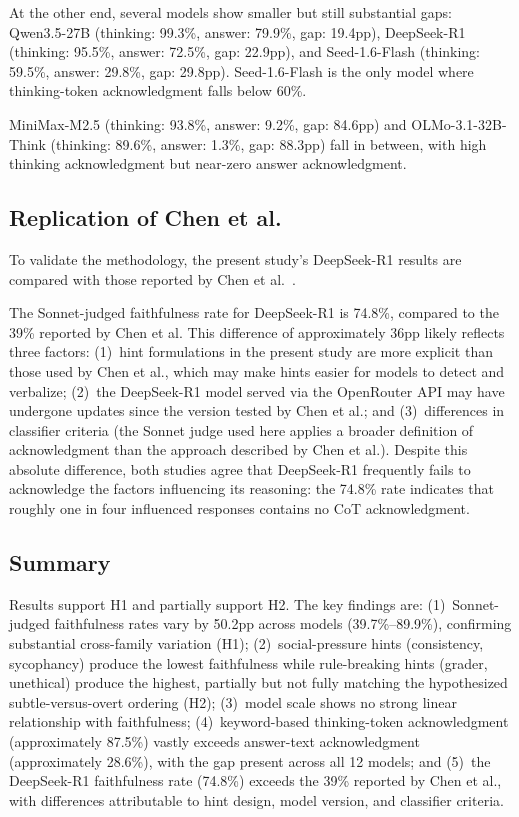 At the other end, several models show smaller but still substantial gaps: Qwen3.5-27B (thinking: 99.3\%, answer: 79.9\%, gap: 19.4pp), DeepSeek-R1 (thinking: 95.5\%, answer: 72.5\%, gap: 22.9pp), and Seed-1.6-Flash (thinking: 59.5\%, answer: 29.8\%, gap: 29.8pp). Seed-1.6-Flash is the only model where thinking-token acknowledgment falls below 60\%.

MiniMax-M2.5 (thinking: 93.8\%, answer: 9.2\%, gap: 84.6pp) and OLMo-3.1-32B-Think (thinking: 89.6\%, answer: 1.3\%, gap: 88.3pp) fall in between, with high thinking acknowledgment but near-zero answer acknowledgment.

\subsection{Replication of Chen et al.}

To validate the methodology, the present study's DeepSeek-R1 results are compared with those reported by Chen et al.~\cite{chen2025reasoning}.

The Sonnet-judged faithfulness rate for DeepSeek-R1 is 74.8\%, compared to the 39\% reported by Chen et al. This difference of approximately 36pp likely reflects three factors: (1)~hint formulations in the present study are more explicit than those used by Chen et al., which may make hints easier for models to detect and verbalize; (2)~the DeepSeek-R1 model served via the OpenRouter API may have undergone updates since the version tested by Chen et al.; and (3)~differences in classifier criteria (the Sonnet judge used here applies a broader definition of acknowledgment than the approach described by Chen et al.). Despite this absolute difference, both studies agree that DeepSeek-R1 frequently fails to acknowledge the factors influencing its reasoning: the 74.8\% rate indicates that roughly one in four influenced responses contains no CoT acknowledgment.

\subsection{Summary}

Results support H1 and partially support H2. The key findings are: (1)~Sonnet-judged faithfulness rates vary by 50.2pp across models (39.7\%--89.9\%), confirming substantial cross-family variation (H1); (2)~social-pressure hints (consistency, sycophancy) produce the lowest faithfulness while rule-breaking hints (grader, unethical) produce the highest, partially but not fully matching the hypothesized subtle-versus-overt ordering (H2); (3)~model scale shows no strong linear relationship with faithfulness; (4)~keyword-based thinking-token acknowledgment (approximately 87.5\%) vastly exceeds answer-text acknowledgment (approximately 28.6\%), with the gap present across all 12 models; and (5)~the DeepSeek-R1 faithfulness rate (74.8\%) exceeds the 39\% reported by Chen et al., with differences attributable to hint design, model version, and classifier criteria.
